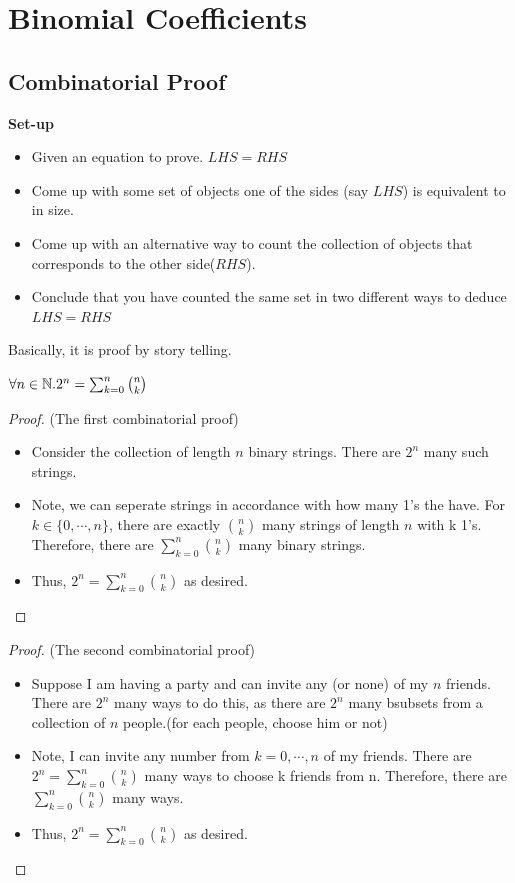 \chapter{Binomial Coefficients}

\section{Combinatorial Proof}

\textbf{Set-up}
\begin{itemize}
    \item Given an equation to prove. $LHS=RHS$
    \item Come up with some set of objects one of the sides (say $LHS$) is equivalent to in size.
    \item Come up with an alternative way to count the collection of objects that corresponds to the other side($RHS$).
    \item Conclude that you have counted the same set in two different ways to deduce $LHS=RHS$
\end{itemize}
Basically, it is proof by story telling.

\begin{theorem}
    $\forall n \in \mathbb{N}. 2^n=\sum_{k=0}^{n}{n \choose k}$
\end{theorem}
\begin{proof}
(The first combinatorial proof)
    \begin{itemize}
        \item Consider the collection of length $n$ binary strings. There are $2^n$ many such strings.
        \item Note, we can seperate strings in accordance with how many 1's the have. For $k \in \{0, \cdots ,n\}$, there are exactly ${n \choose k}$ many strings of length $n$ with k 1's. Therefore, there are $\sum_{k=0}^{n}{n \choose k}$ many binary strings.
        \item Thus, $2^n=\sum_{k=0}^{n}{n \choose k}$ as desired.
    \end{itemize}
\end{proof}
\begin{proof}
(The second combinatorial proof)
\begin{itemize}
    \item Suppose I am having a party and can invite any (or none) of my $n$ friends. There are $2^n$ many ways to do this, as there are $2^n$ many bsubsets from a collection of $n$ people.(for each people, choose him or not)
    \item Note, I can invite any number from $k=0, \cdots ,n$ of my friends. There are $2^n=\sum_{k=0}^{n}{n \choose k}$ many ways to choose k friends from n. Therefore, there are $\sum_{k=0}^{n}{n \choose k}$ many ways.
    \item Thus, $2^n=\sum_{k=0}^{n}{n \choose k}$ as desired.
\end{itemize}
\end{proof}

